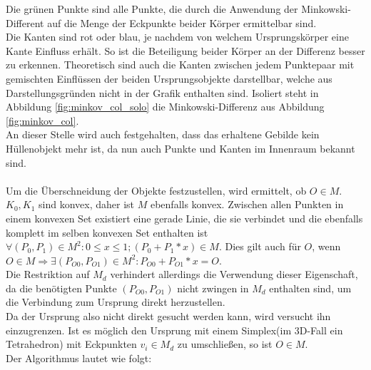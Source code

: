 Die grünen Punkte sind alle Punkte, die durch die Anwendung der Minkowski-Different auf die Menge der Eckpunkte beider Körper ermittelbar sind.\\
Die Kanten sind rot oder blau, je nachdem von welchem Ursprungskörper eine Kante Einfluss erhält. So ist die Beteiligung beider Körper an der Differenz besser zu erkennen. Theoretisch sind auch die Kanten zwischen jedem Punktepaar mit gemischten Einflüssen der beiden Ursprungsobjekte darstellbar, welche aus Darstellungsgründen nicht in der Grafik enthalten sind. Isoliert steht in Abbildung \ref{fig:minkov_col_solo} die Minkowski-Differenz aus Abbildung \ref{fig:minkov_col}.\\
An dieser Stelle wird auch festgehalten, dass das erhaltene Gebilde kein Hüllenobjekt mehr ist, da nun auch Punkte und Kanten im Innenraum bekannt sind.\\
\\
Um die Überschneidung der Objekte festzustellen, wird ermittelt, ob $O\in M$.\\
$K_0, K_1$ sind konvex, daher ist $M$ ebenfalls konvex. Zwischen allen Punkten in einem konvexen Set existiert eine gerade Linie, die sie verbindet und die ebenfalls komplett im selben konvexen Set enthalten ist $\forall (P_0, P_1)\in M^2 : 0 \le x \le 1 ; (P_0 + P_1*x) \in M$. Dies gilt auch für $O$, wenn $O\in M \Rightarrow \exists (P_{O0}, P_{O1}) \in M^2 : P_{O0} + P_{O1}*x = O$.\\
Die Restriktion auf $M_d$ verhindert allerdings die Verwendung dieser Eigenschaft, da die benötigten Punkte $(P_{O0}, P_{O1})$ nicht zwingen in $M_d$ enthalten sind, um die Verbindung zum Ursprung direkt herzustellen.\\
Da der Ursprung also nicht direkt gesucht werden kann, wird versucht ihn einzugrenzen. Ist es möglich den Ursprung mit einem Simplex(im 3D-Fall ein Tetrahedron) mit Eckpunkten $v_i \in M_d$ zu umschließen, so ist $O\in M$.\\
Der Algorithmus lautet wie folgt:

